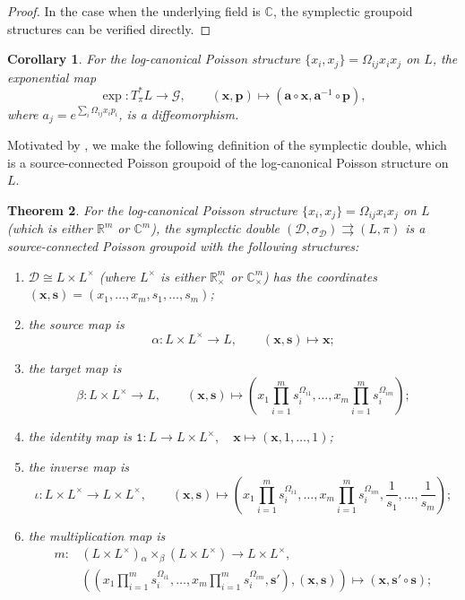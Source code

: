 \documentclass{amsart}
\newtheorem{theorem}{Theorem}[section]
\newtheorem{corollary}[theorem]{Corollary}
\numberwithin{equation}{section}
\newcommand{\bfa}{{\boldsymbol{a}}}
\newcommand{\bfp}{{\boldsymbol{p}}}
\newcommand{\bfs}{{\boldsymbol{s}}}
\newcommand{\bfx}{{\boldsymbol{x}}}
\newcommand{\cD}{\mathcal{D}}
\newcommand{\cG}{\mathcal{G}}
\newcommand{\CC}{\mathbb{C}}
\newcommand{\RR}{\mathbb{R}}
\newcommand{\rra}{\rightrightarrows}
\begin{document}
\begin{proof}
  In the case when the underlying field is $\CC$, the symplectic groupoid structures can be verified directly.
\end{proof}

\begin{corollary} \label{cor:exp}
  For the log-canonical Poisson structure $\{x_i, x_j\} = \Omega_{ij} x_i x_j$ on $L$, the exponential map
  \[\exp: T^*_\pi L \to \cG, \qquad (\bfx, \bfp) \mapsto \left(\bfa \circ \bfx, \bfa^{-1} \circ \bfp\right),\]
  where $a_j = e^{\sum_i \Omega_{ij} x_ip_i}$, is a diffeomorphism.
\end{corollary}

Motivated by \cite{FG09c}, we make the following definition of the symplectic double, which is a source-connected Poisson groupoid of the log-canonical Poisson structure on $L$.
\begin{theorem} \label{thm:SymDBLoc}
  \cite{FG09c}
  For the log-canonical Poisson structure $\{x_i, x_j\} = \Omega_{ij} x_i x_j$ on $L$ (which is either $\RR^m$ or $\CC^m$), the \emph{symplectic double} $(\cD, \sigma_\cD) \rra (L, \pi)$ is a source-connected Poisson groupoid with the following structures:
  \begin{enumerate}
    \item $\cD \cong L \times L^\times$ (where $L^\times$ is either $\RR_\times^m$ or $\CC_\times^m$) has the coordinates $(\bfx, \bfs) = (x_1, \ldots, x_m, s_1, \ldots, s_m)$;
    \item the source map is
      \[\alpha: L \times L^\times \to L, \qquad (\bfx, \bfs) \mapsto \bfx;\]
    \item the target map is
      \[\beta: L \times L^\times \to L, \qquad (\bfx, \bfs) \mapsto \left(x_1 \prod_{i=1}^m s_i^{\Omega_{i1}}, \ldots, x_m \prod_{i=1}^m s_i^{\Omega_{im}}\right);\]
    \item the identity map is $\mathtt{1}: L \to L \times L^\times, \quad \bfx \mapsto (\bfx, 1, \ldots, 1)$;
    \item the inverse map is
      \[\iota: L \times L^\times \to L \times L^\times, \qquad (\bfx,\bfs) \mapsto \left(x_1\prod_{i=1}^m s_i^{\Omega_{i1}}, \ldots, x_m\prod_{i=1}^m s_i^{\Omega_{im}}, \frac{1}{s_1}, \ldots, \frac{1}{s_m}\right);\]
    \item the multiplication map is
      \[\begin{aligned}
	  m: & \left(L \times L^\times\right) {_\alpha \times_\beta} \left(L \times L^\times\right) \to L \times L^\times, \\
	     & \left(\left(x_1 \prod_{i=1}^m s_i^{\Omega_{i1}}, \ldots, x_m \prod_{i=1}^m s_i^{\Omega_{im}}, \bfs'\right), (\bfx, \bfs)\right) \mapsto (\bfx, \bfs' \circ \bfs);

\end{aligned}\]
\end{enumerate}
\end{theorem}
\end{document}
